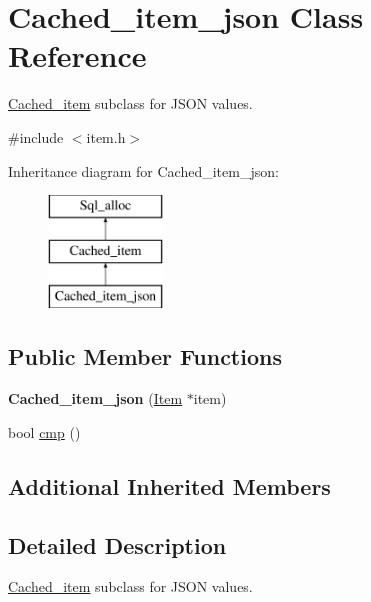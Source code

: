 \hypertarget{classCached__item__json}{}\section{Cached\+\_\+item\+\_\+json Class Reference}
\label{classCached__item__json}


\mbox{\hyperlink{classCached__item}{Cached\+\_\+item}} subclass for J\+S\+ON values.  




{\ttfamily \#include $<$item.\+h$>$}

Inheritance diagram for Cached\+\_\+item\+\_\+json\+:\begin{figure}[H]
\begin{center}
\leavevmode
\includegraphics[height=3.000000cm]{classCached__item__json}
\end{center}
\end{figure}
\subsection*{Public Member Functions}
\begin{DoxyCompactItemize}
\item 
\mbox{\label{classCached__item__json_a6556ff8fc246c4db92e551ab2ee915e7}} 
{\bfseries Cached\+\_\+item\+\_\+json} (\mbox{\hyperlink{classItem}{Item}} $\ast$item)
\item 
bool \mbox{\hyperlink{classCached__item__json_a5f0c852aa12e5f2072ddf5b683f2995d}{cmp}} ()
\end{DoxyCompactItemize}
\subsection*{Additional Inherited Members}


\subsection{Detailed Description}
\mbox{\hyperlink{classCached__item}{Cached\+\_\+item}} subclass for J\+S\+ON values. 

